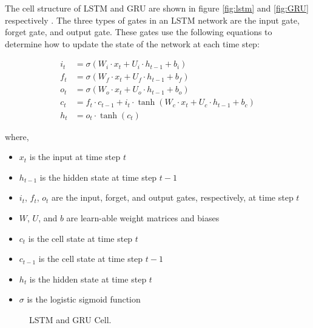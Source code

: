  The cell structure of LSTM and GRU are shown in figure \ref{fig:lstm} and \ref{fig:GRU} respectively \cite{colah_2015}. The three types of gates in an LSTM network are the input gate, forget gate, and output gate. These gates use the following equations to determine how to update the state of the network at each time step:


\begin{align}
 i_t &= \sigma(W_i \cdot x_t + U_i \cdot h_{t-1} + b_i) \\
 f_t &= \sigma(W_f \cdot x_t + U_f \cdot h_{t-1} + b_f) \\
 o_t &= \sigma(W_o \cdot x_t + U_o \cdot h_{t-1} + b_o) \\
 c_t &= f_t \cdot c_{t-1} + i_t \cdot \tanh(W_c \cdot x_t + U_c \cdot h_{t-1} + b_c) \\
 h_t &= o_t \cdot \tanh(c_t)
\end{align}

where,

\begin{itemize}[label=$\cdot$]
    \item $x_t$ is the input at time step $t$
    \item $h_{t-1}$ is the hidden state at time step $t-1$
    \item $i_t$, $f_t$, $o_t$ are the input, forget, and output gates, respectively, at time step $t$
    \item $W$, $U$, and $b$ are learn-able weight matrices and biases
    \item $c_t$ is the cell state at time step $t$
    \item $c_{t-1}$ is the cell state at time step $t-1$
    \item $h_t$ is the hidden state at time step $t$
    \item $\sigma$ is the logistic sigmoid function 
\end{itemize}

\begin{figure}
  \caption{LSTM and GRU Cell.}
  \label{fig:LSTM_GRU}
\end{figure}

